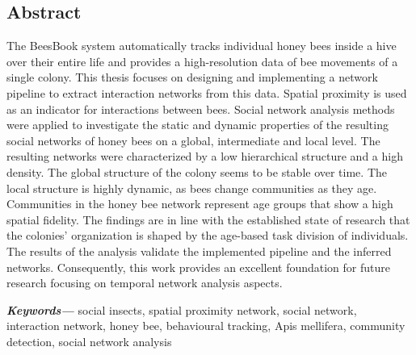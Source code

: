 %
\pagestyle{empty}
\providecommand{\keywords}[1]{\textbf{\textit{Keywords---}} #1}

\subsection*{Abstract}
The BeesBook system automatically tracks individual honey bees inside a hive over their entire life and provides a high-resolution data of bee movements of a single colony.
This thesis focuses on designing and implementing a network pipeline to extract interaction networks from this data.
Spatial proximity is used as an indicator for interactions between bees. Social network analysis methods were applied to investigate the static and dynamic properties of the resulting social networks of honey bees on a global, intermediate and local level.
The resulting networks were characterized by a low hierarchical structure and a high density. The global structure of the colony seems to be stable over time. The local structure is highly dynamic, as bees change communities as they age. 
Communities in the honey bee network represent age groups that show a high spatial fidelity.
The findings are in line with the established state of research that the colonies' organization is shaped by the age-based task division of individuals.
The results of the analysis validate the implemented pipeline and the inferred networks.
Consequently, this work provides an excellent foundation for future research focusing on temporal network analysis aspects.

\vspace{5mm}
\keywords{social insects, spatial proximity network, social network, interaction network, honey bee, behavioural tracking, Apis mellifera, community detection, social network analysis}

\cleardoublepage
